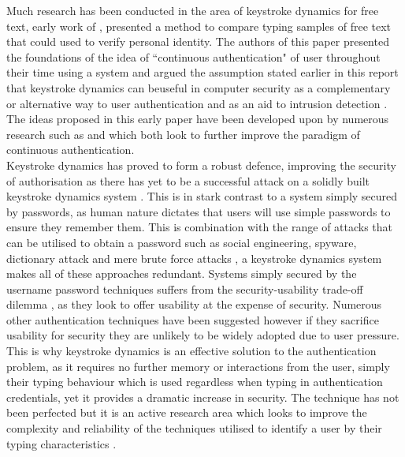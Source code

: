 \documentclass{article}
\begin{document}
Much research has been conducted in the area of keystroke dynamics for free text, early work of \parencite{Gunetti:2005}, presented a method to compare typing samples of free text that could used to verify personal identity. The authors of this paper  presented the foundations of the idea of ``continuous authentication" of user throughout their time using a system and argued the assumption stated earlier in this report  that keystroke dynamics can beuseful in computer security as a complementary or alternative way to user authentication and as an aid to intrusion detection \parencite{Gunetti:2005}. The ideas proposed in this early paper have been developed upon by numerous research such as \parencite{contFreeText} and \parencite{sznur2015advances} which both look to further improve the paradigm of continuous authentication. \\

Keystroke dynamics has proved to form a robust defence, improving the security of authorisation as there has yet to be a successful attack on a solidly built keystroke dynamics system \parencite{sznur2015advances}. This is in stark contrast to a system simply secured by passwords, as human nature dictates that users will use simple passwords to ensure they remember them. This is combination with the range of attacks that can be utilised to obtain a password such as social engineering, spyware, dictionary attack and mere brute force attacks \parencite{alsultan2013keystroke}, a keystroke dynamics system makes all of these approaches redundant. Systems simply secured by the username password techniques suffers from the security-usability trade-off dilemma \parencite{alsultan2013keystroke}, as they look to offer usability at the expense of security. Numerous other authentication techniques have been suggested however if they sacrifice usability for security they are unlikely to be widely adopted due to user pressure. This is why keystroke dynamics is an effective solution to the authentication problem, as it requires no further memory or interactions from the user, simply their typing behaviour which is used regardless when typing in authentication credentials, yet it provides a dramatic increase in security. The technique has not been perfected but it is an active research area which looks to improve the complexity and reliability of the techniques utilised to identify a user by their typing characteristics \parencite{sznur2015advances}. \\  
\end{document}

